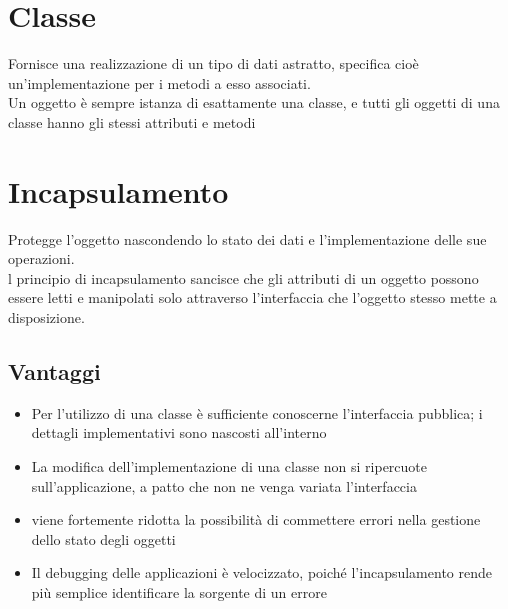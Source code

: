 \documentclass{report}
\begin{document}
        \section{Classe}
            Fornisce una realizzazione di un tipo di dati astratto, specifica cioè un’implementazione per i metodi a esso associati.
            \\
            Un oggetto è sempre istanza di esattamente una classe, e tutti gli oggetti di una classe hanno gli stessi attributi e metodi
        \section{Incapsulamento}
            Protegge l’oggetto nascondendo lo stato dei dati e l’implementazione delle sue operazioni.
            \\
            l principio di incapsulamento sancisce che gli attributi di un oggetto possono essere letti e manipolati solo attraverso l’interfaccia che l’oggetto stesso mette a disposizione.
            \\
            \subsection{Vantaggi}
                \begin{itemize}
                    \item Per l’utilizzo di una classe è sufficiente conoscerne l’interfaccia pubblica; i dettagli implementativi sono nascosti all’interno
                    \item La modifica dell’implementazione di una classe non si ripercuote sull’applicazione, a patto che non ne venga variata l’interfaccia
                    \item viene fortemente ridotta la possibilità di commettere errori nella gestione dello stato degli oggetti 
                    \item Il debugging delle applicazioni è velocizzato, poiché l’incapsulamento rende più semplice identificare la sorgente di un errore
                \end{itemize}
\end{document}
